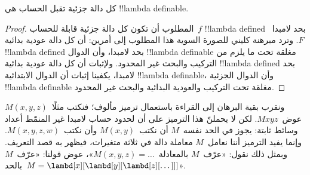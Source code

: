 \documentclass[../../../include/open-logic-section]{subfiles}
\begin{document}

\begin{thm}
كل دالة جزئية تقبل الحساب هي !!{lambda definable}.
\end{thm}

\begin{proof}
المطلوب أن تكون كل دالة جزئية قابلة للحساب~$f$
!!{lambda defined} بحد لامبدا~$F$.
وترد مبرهنة كليني للصورة السوية هذا المطلوب إلى أمرين:
أن كل دالة عودية بدائية !!{lambda defined} بحد لامبدا،
وأن الدوال !!{lambda definable} مغلقة تحت ما يلزم من
التركيب والبحث غير المحدود.
ولإثبات أن كل دالة عودية بدائية !!{lambda defined} بحد لامبدا،
يكفينا إثبات أن الدوال الابتدائية !!{lambda definable}،
وأن الدوال الجزئية !!{lambda definable} مغلقة تحت التركيب
والعودية البدائية والبحث غير المحدود.
\end{proof}

ونقرب بقية البرهان إلى القراءة باستعمال ترميز مألوف؛
فنكتب مثلًا~$M(x, y, z)$ عوض~$Mxyz$.
لكن لا يحملنّ هذا الترميز على أن لحدود حساب لامبدا غير
المنمّط أعداد وسائط ثابتة: يجوز في الحد نفسه~$M$
أن نكتب~$M(x,y)$ وأن نكتب~$M(x,y,z,w)$.
وإنما يفيد الترميز أننا نعامل~$M$ معاملة دالة في ثلاثة
متغيرات، فيظهر به قصد التعريف.
وبمثل ذلك نقول: «عرّف~$M$ بالمعادلة~$M(x,y,z) = \dots$»،
عوض قولنا: «عرّف~$M$ بالحد~$M = \lambd[x][\lambd[y][\lambd[z][\dots]]]$».
\end{document}
